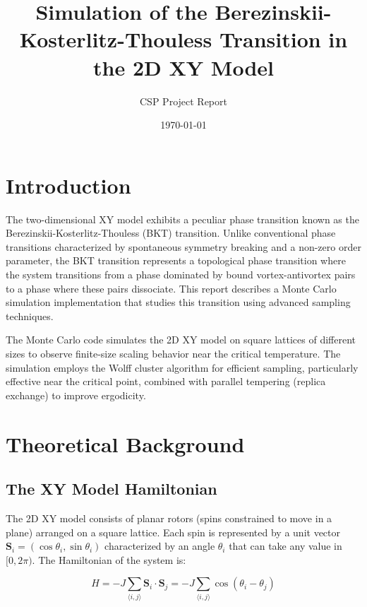 \documentclass[12pt,a4paper]{article}
\title{Simulation of the Berezinskii-Kosterlitz-Thouless Transition in the 2D XY Model}
\author{CSP Project Report}
\date{\today}
\begin{document}
\maketitle

\tableofcontents
\vspace{1cm}

\section{Introduction}

The two-dimensional XY model exhibits a peculiar phase transition known as the Berezinskii-Kosterlitz-Thouless (BKT) transition. Unlike conventional phase transitions characterized by spontaneous symmetry breaking and a non-zero order parameter, the BKT transition represents a topological phase transition where the system transitions from a phase dominated by bound vortex-antivortex pairs to a phase where these pairs dissociate. This report describes a Monte Carlo simulation implementation that studies this transition using advanced sampling techniques.

The Monte Carlo code simulates the 2D XY model on square lattices of different sizes to observe finite-size scaling behavior near the critical temperature. The simulation employs the Wolff cluster algorithm for efficient sampling, particularly effective near the critical point, combined with parallel tempering (replica exchange) to improve ergodicity.

\section{Theoretical Background}

\subsection{The XY Model Hamiltonian}

The 2D XY model consists of planar rotors (spins constrained to move in a plane) arranged on a square lattice. Each spin is represented by a unit vector $\mathbf{S}_i = (\cos\theta_i, \sin\theta_i)$ characterized by an angle $\theta_i$ that can take any value in $[0, 2\pi)$. The Hamiltonian of the system is:

\begin{equation}
H = -J \sum_{\langle i,j \rangle} \mathbf{S}_i \cdot \mathbf{S}_j = -J \sum_{\langle i,j \rangle} \cos(\theta_i - \theta_j)
\end{equation}
\end{document}
